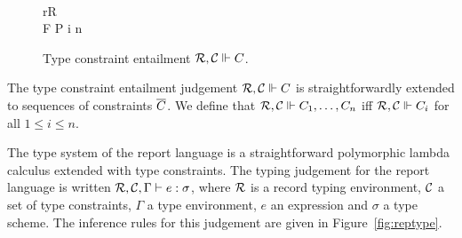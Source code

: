 \begin{figure}
  {\constrEnt\calR\calC{\ordC{\tau}}}%
  \\[1em]%
  {\constrEnt\calR\calC{\ordC{\tau}}}%
  {\constrEnt\calR\calC{\eqC{\tau}}}%
  \quad%
  { r\in R}%
  {}%
  \\[2em]%
  {F \in \set{(\cdot,\cdot), +, \tlist{\cdot},\tent{\cdot}}}%
  {P \in \set{\ordC{\cdot},\eqC{\cdot}}}%
  { \le i \le n\colon\;\constrEnt\calR{}}%
  {\constrEnt\calR{}}%
  \caption{Type constraint entailment ${\mathcal R}, {\mathcal C} \Vdash C$.}
  \label{fig:constr}
\end{figure}

The type constraint entailment judgement ${\mathcal R}, {\mathcal C} \Vdash C$ is
straightforwardly extended to sequences of constraints $\overline{C}$. We
define that ${\mathcal R}, {\mathcal C} \Vdash C_1,\dots,C_n$ iff
${\mathcal R}, {\mathcal C} \Vdash C_i$ for all $ 1\le i \le n$.


The type system of the report language is a straightforward
polymorphic lambda calculus extended with type constraints. The typing
judgement for the report language is written
${\mathcal R}, {\mathcal C}, \Gamma \vdash e : \sigma$, where ${\mathcal R}$ is a record
typing environment, ${\mathcal C}$ a set of type constraints, $\Gamma$ a type
environment, $e$ an expression and $\sigma$ a type scheme. The
inference rules for this judgement are given in
Figure~\ref{fig:reptype}.


